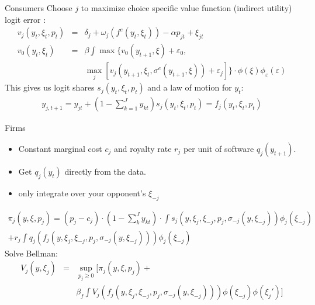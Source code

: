 \documentclass[xcolor=pdftex,dvipsnames,table,mathserif]{beamer}
\begin{document}
\begin{frame}{Consumers}
Choose $j$ to maximize choice specific value function (indirect utility) logit error :
\begin{eqnarray*}
v_j (y_t,\xi_t,p_t) &=& \delta_j + \omega_j( f^e(y_t,\xi_t)) - \alpha p_{jt} + \xi_{jt}\\
v_0(y_t,\xi_t) &=& \beta \int \max\{ v_0(y_{t+1},\xi) + \varepsilon_0, \\
&&  \max_j [v_j (y_{t+1},\xi_t,\sigma^e(y_{t+1},\xi)) + \varepsilon_j ] \} \cdot \phi(\xi) \phi_{\varepsilon}(\varepsilon)
\end{eqnarray*}
This gives us logit shares $s_j(y_{t},\xi_{t},p_t)$ and a law of motion for $y_{t}$:
\begin{eqnarray*}
y_{j,t+1} = y_{jt} + (1-\sum_{k=1}^J y_{kt}) s_j(y_t,\xi_t, p_t) = f_j (y_t, \xi_t, p_t)
\end{eqnarray*}
\end{frame}


\begin{frame}{Firms}
\begin{itemize}
\item Constant marginal cost $c_j$ and royalty rate $r_j$ per unit of software $q_j(y_{t+1})$.
\item Get $q_j(y_t)$ directly from the data.
\item only integrate over your opponent's $\xi_{-j}$
\end{itemize}
\small
\begin{eqnarray*} \pi_j(y,\xi,p_j) = (p_j - c_j) \cdot (1-\sum_k^{J} y_{kt}) \cdot \int s_j(y,\xi_j,\xi_{-j},p_j,\sigma_{-j}(y,\xi_{-j})) \phi_j(\xi_{-j}) \\
+ r_j \int q_j(f_j(y,\xi_j,\xi_{-j},p_j,\sigma_{-j}(y,\xi_{-j}))) \phi_j(\xi_{-j})
\end{eqnarray*}
Solve Bellman:
\begin{eqnarray*} 
V_j(y,\xi_j) &=& \sup_{p_j \geq 0} [ \pi_j(y,\xi,p_j) +\\
 && \beta_f \int V_j(f_j(y,\xi_j,\xi_{-j},p_j,\sigma_{-j}(y,\xi_{-j}))) \phi(\xi_{-j}) \phi(\xi_j')]
\end{eqnarray*}


\end{frame}
\end{document}
